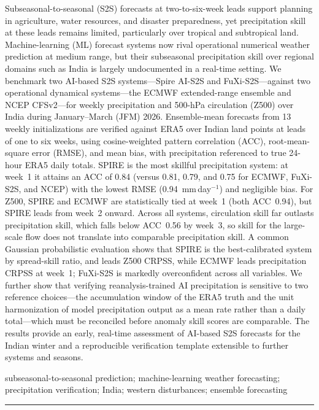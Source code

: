 \documentclass[11pt,a4paper]{article}
\begin{document}
\begin{abstractbox}
\enspace
Subseasonal-to-seasonal (S2S) forecasts at two-to-six-week leads
support planning in agriculture, water resources, and disaster
preparedness, yet precipitation skill at these leads remains limited,
particularly over tropical and subtropical land. Machine-learning (ML)
forecast systems now rival operational numerical weather prediction at
medium range, but their subseasonal precipitation skill over regional
domains such as India is largely undocumented in a real-time setting.
We benchmark two AI-based S2S systems---Spire AI-S2S and
FuXi-S2S---against two operational dynamical systems---the ECMWF
extended-range ensemble and NCEP CFSv2---for weekly precipitation and
500-hPa circulation (Z500) over India during January--March (JFM) 2026.
Ensemble-mean forecasts from 13 weekly initializations are verified
against ERA5 over Indian land points at leads of one to six weeks, using
cosine-weighted pattern correlation (ACC), root-mean-square error
(RMSE), and mean bias, with precipitation referenced to true 24-hour
ERA5 daily totals. SPIRE is the most skillful precipitation system: at week~1 it attains an
ACC of 0.84 (versus 0.81, 0.79, and 0.75 for ECMWF, FuXi-S2S, and NCEP)
with the lowest RMSE (0.94~mm\,day$^{-1}$) and negligible bias. For Z500,
SPIRE and ECMWF are statistically tied at week~1 (both ACC~0.94), but
SPIRE leads from week~2 onward. Across all systems, circulation skill
far outlasts precipitation skill, which falls below ACC~0.56 by week~3,
so skill for the large-scale flow does not translate into comparable
precipitation skill. A common Gaussian probabilistic evaluation shows
that SPIRE is the best-calibrated system by spread-skill ratio, and
leads Z500 CRPSS, while ECMWF leads precipitation CRPSS at week~1;
FuXi-S2S is markedly overconfident across all variables. We further show that verifying
reanalysis-trained AI precipitation is sensitive to two reference
choices---the accumulation window of the ERA5 truth and the unit
harmonization of model precipitation output as a mean rate rather than a
daily total---which must be reconciled before anomaly skill scores are
comparable. The results provide an early, real-time assessment of
AI-based S2S forecasts for the Indian winter and a reproducible
verification template extensible to further systems and seasons.
\end{abstractbox}

\vspace{3pt}
%
{\small subseasonal-to-seasonal prediction;
machine-learning weather forecasting; precipitation verification;
India; western disturbances; ensemble forecasting}
\vspace{6pt}
{\color{accentrule!50}\rule{\linewidth}{0.4pt}}
\vspace{2pt}
\end{document}

